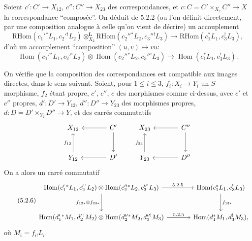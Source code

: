 \documentclass[11pt]{article}
\DeclareMathOperator{\Hom}{Hom}
\providecommand{\RHom}{\mathrm{RHom}}
\providecommand{\RHom}{\mathrm{RHom}}
\providecommand{\Hom}{\operatorname{Hom}}
\providecommand{\RHom}{\mathrm R\mathcal{H}om}
\providecommand{\RHom}{\mathrm{RHom}}
\providecommand{\Hom}{\operatorname{Hom}}
\begin{document}
Soient $c':C'\to X_{12}$, $c'':C''\to X_{23}$ des correspondances, et $c:C=C'\times_{X_2}C''\to X$ la correspondance ``composée''. On déduit de 5.2.2 (ou l'on définit directement, par une composition analogue à celle qu'on vient de décrire) un accouplement
\begin{equation}
\tag{5.2.4}
\RHom(c_1'{}^*L_1,c_2'{}^!L_2)\otimes_{X_2}^{\mathbf L}\RHom(c_2''{}^*L_2,c_3''{}^!L_3)
\longrightarrow\RHom(c_1^*L_1,c_3^!L_3),
\end{equation}
d'où un accouplement ``composition'' $(u,v)\mapsto vu$:
\begin{equation}
\tag{5.2.5}
\Hom(c_1'{}^*L_1,c_2'{}^!L_2)\otimes\Hom(c_2''{}^*L_2,c_3''{}^!L_3)
\longrightarrow\Hom(c_1^*L_1,c_3^!L_3).
\end{equation}

On vérifie que la composition des correspondances est compatible aux images directes, dans le sens suivant. Soient, pour $1\leq i\leq 3$, $f_i:X_i\to Y_i$ un $S$-morphisme, $f_2$ étant propre, $c'$, $c''$, $c$ des morphismes comme ci-dessus, avec $c'$ et $c''$ propres, $d':D'\to Y_{12}$, $d'':D''\to Y_{23}$ des morphismes propres, $d:D=D'\times_{Y_2}D''\to Y$, et des carrés commutatifs
\[
\begin{tikzcd}[column sep=large,row sep=large]
X_{12} & C' \arrow[l] \arrow[d] \\
Y_{12} \arrow[u,"f_{12}"] & D' \arrow[l]
\end{tikzcd}
\qquad
\begin{tikzcd}[column sep=large,row sep=large]
X_{23} & C'' \arrow[l] \arrow[d] \\
Y_{23} \arrow[u,"f_{23}"] & D'' \arrow[l]
\end{tikzcd}
\]
On a alors un carré commutatif
\begin{equation}
\tag{5.2.6}
\begin{tikzcd}[column sep=large,row sep=large]
\Hom(c_1'{}^*L_1,c_2'{}^!L_2)\otimes\Hom(c_2''{}^*L_2,c_3''{}^!L_3) \arrow[r,"5.2.5"] \arrow[d,"f_{12*}\otimes f_{23*}"']
& \Hom(c_1^*L_1,c_3^!L_3) \arrow[d,"f_{13*}"] \\
\Hom(d_1'{}^*M_1,d_2'{}^!M_2)\otimes\Hom(d_2''{}^*M_2,d_3''{}^!M_3) \arrow[r,"5.2.5"]
& \Hom(d_1^*M_1,d_3^!M_3),
\end{tikzcd}
\end{equation}
où $M_i=f_{i!}L_i$.
\end{document}
